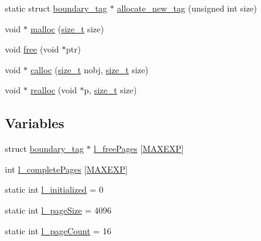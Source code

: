 \begin{DoxyCompactItemize}
static struct \hyperlink{a00126}{boundary\+\_\+tag} $\ast$ \hyperlink{a00035_a8e465ea231c950756bcd4e41244c61a1_a8e465ea231c950756bcd4e41244c61a1}{allocate\+\_\+new\+\_\+tag} (unsigned int size)
\item 
void $\ast$ \hyperlink{a00035_a7ac38fce3243a7dcf448301ee9ffd392_a7ac38fce3243a7dcf448301ee9ffd392}{malloc} (\hyperlink{a00038_a7c94ea6f8948649f8d181ae55911eeaf_a7c94ea6f8948649f8d181ae55911eeaf}{size\+\_\+t} size)
\item 
void \hyperlink{a00035_afbedc913aa4651b3c3b4b3aecd9b4711_afbedc913aa4651b3c3b4b3aecd9b4711}{free} (void $\ast$ptr)
\item 
void $\ast$ \hyperlink{a00035_a0831129f5172700d42788e7201bdb25e_a0831129f5172700d42788e7201bdb25e}{calloc} (\hyperlink{a00038_a7c94ea6f8948649f8d181ae55911eeaf_a7c94ea6f8948649f8d181ae55911eeaf}{size\+\_\+t} nobj, \hyperlink{a00038_a7c94ea6f8948649f8d181ae55911eeaf_a7c94ea6f8948649f8d181ae55911eeaf}{size\+\_\+t} size)
\item 
void $\ast$ \hyperlink{a00035_ac5f241a082afc3c26df1eb7dfdd8d8e0_ac5f241a082afc3c26df1eb7dfdd8d8e0}{realloc} (void $\ast$p, \hyperlink{a00038_a7c94ea6f8948649f8d181ae55911eeaf_a7c94ea6f8948649f8d181ae55911eeaf}{size\+\_\+t} size)
\end{DoxyCompactItemize}
\subsection*{Variables}
\begin{DoxyCompactItemize}
\item 
struct \hyperlink{a00126}{boundary\+\_\+tag} $\ast$ \hyperlink{a00035_a78b8b6e448179d3cd64915f99fee60e0_a78b8b6e448179d3cd64915f99fee60e0}{l\+\_\+free\+Pages} \mbox{[}\hyperlink{a00035_af823bb7d083fafbd662be7ea09582013_af823bb7d083fafbd662be7ea09582013}{M\+A\+X\+E\+XP}\mbox{]}
\item 
int \hyperlink{a00035_a213db3baf1d4b13d604015489247980d_a213db3baf1d4b13d604015489247980d}{l\+\_\+complete\+Pages} \mbox{[}\hyperlink{a00035_af823bb7d083fafbd662be7ea09582013_af823bb7d083fafbd662be7ea09582013}{M\+A\+X\+E\+XP}\mbox{]}
\item 
static int \hyperlink{a00035_a4aac6ed0ba0144598c5abe18222c3493_a4aac6ed0ba0144598c5abe18222c3493}{l\+\_\+initialized} = 0
\item 
static int \hyperlink{a00035_a5008d6a07ef0a4f9e325993716cc228e_a5008d6a07ef0a4f9e325993716cc228e}{l\+\_\+page\+Size} = 4096
\item 
static int \hyperlink{a00035_a8f81c0408f42ca5d936221d15f918275_a8f81c0408f42ca5d936221d15f918275}{l\+\_\+page\+Count} = 16
\end{DoxyCompactItemize}


